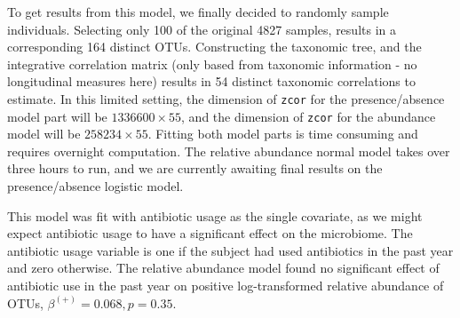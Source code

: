 \documentclass[12pt]{article}
\begin{document}
To get results from this model, we finally decided to randomly sample individuals. Selecting only 100 of the original 4827 samples, results in a corresponding 164 distinct OTUs. Constructing the taxonomic tree, and the integrative correlation matrix (only based from taxonomic information - no longitudinal measures here) results in 54 distinct taxonomic correlations to estimate. In this limited setting, the dimension of \texttt{zcor} for the presence/absence model part will be $1336600 \times 55$, and the dimension of \texttt{zcor} for the abundance model will be $258234 \times 55$. Fitting both model parts is time consuming and requires overnight computation. The relative abundance normal model takes over three hours to run, and we are currently awaiting final results on the presence/absence logistic model.

This model was fit with antibiotic usage as the single covariate, as we might expect antibiotic usage to have a significant effect on the microbiome. The antibiotic usage variable is one if the subject had used antibiotics in the past year and zero otherwise. The relative abundance model found no significant effect of antibiotic use in the past year on positive log-transformed relative abundance of OTUs, $\beta^{(+)} = 0.068, p = 0.35$.


%
\end{document}
